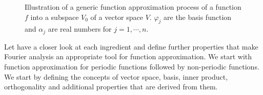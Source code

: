 \documentclass[11pt, oneside]{article}   	%
\begin{document}
\begin{figure}[H]
\begin{center}
\end{center}
\caption{Illustration of a generic function approximation process of a function $f$ into a subspace $V_{0}$ of a vector space $V$. $\varphi_{j}$ are the basis function and $\alpha_{j}$ are real numbers for $j=1,\cdots,n$.}
\label{figure:il}
\end{figure}
\justify
Let have a closer look at each ingredient and define further properties that make Fourier analysis an appropriate tool for function approximation. We start with function approximation for periodic functions followed by non-periodic functions. We start by  defining the concepts of vector space, basis, inner product, orthogonality and additional properties that are derived from them.
\end{document}
